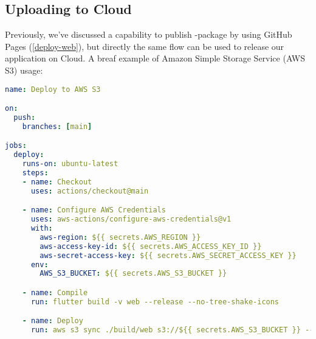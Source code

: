 
\subsection{Uploading to Cloud}

Previously, we've discussed a capability to publish -package by using GitHub Pages (\ref{deploy-web}), but 
directly the same flow can be used to release our application on Cloud. A breaf example of Amazon Simple Storage 
Service (AWS S3) usage:

\begin{lstlisting}[language=yaml]
name: Deploy to AWS S3

on: 
  push:
    branches: [main]

jobs:
  deploy:
    runs-on: ubuntu-latest
    steps:
    - name: Checkout
      uses: actions/checkout@main

    - name: Configure AWS Credentials
      uses: aws-actions/configure-aws-credentials@v1
      with:
        aws-region: ${{ secrets.AWS_REGION }}
        aws-access-key-id: ${{ secrets.AWS_ACCESS_KEY_ID }}
        aws-secret-access-key: ${{ secrets.AWS_SECRET_ACCESS_KEY }}
      env:
        AWS_S3_BUCKET: ${{ secrets.AWS_S3_BUCKET }}

    - name: Compile
      run: flutter build -v web --release --no-tree-shake-icons

    - name: Deploy
      run: aws s3 sync ./build/web s3://${{ secrets.AWS_S3_BUCKET }} --delete
\end{lstlisting}
